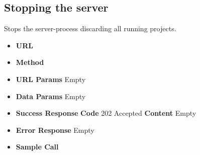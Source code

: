 \subsection{Stopping the server}
Stops the server-process discarding all running projects.

\begin{itemize}
\item \textbf{URL} 
\item \textbf{Method} 

\item \textbf{URL Params} Empty

\item \textbf{Data Params} Empty

\item \textbf{Success Response}
  \newline\textbf{Code} 202 Accepted
  \newline\textbf{Content} Empty

\item \textbf{Error Response} Empty

\item \textbf{Sample Call}
\end{itemize}
